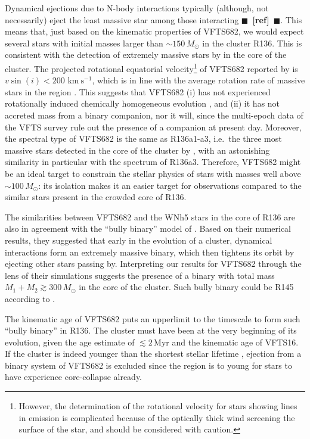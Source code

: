 \documentclass[apjl,twocolumn]{emulateapj}
\newcommand{\todo}[1]{{\large $\blacksquare$~\textbf{\color{red}[#1]}}~$\blacksquare$}
\newcommand{\kms}{{\,\mathrm{km\ s^{-1}}}}
\begin{document}
Dynamical ejections due to N-body interactions typically (although, not necessarily) eject the least
massive star among those interacting \todo{ref}. This means that, just
based on the kinematic properties of VFTS682, we would expect several
stars with initial masses larger than $\sim$$150\,M_\odot$ in the
cluster R136.
This is consistent with the detection
of extremely massive stars by \cite{crowther:10} in the core of the
cluster. The projected rotational equatorial
velocity\footnote{However, the determination of the rotational
  velocity for stars showing lines in emission is complicated because
  of the optically thick wind screening the surface of the star, and should be
  considered with caution.} of VFTS682
reported by \cite{schneider:18} is $v\sin(i)<200\,\kms$, which is in
line with the average rotation rate of massive stars in the region
\citep[][]{ramirez-agudelo:15}. This suggests that VFTS682 (i) has not
experienced rotationally induced chemically homogeneous evolution
\citep[][]{maeder:00,demink:09,marchant:16}, and (ii) it has not
accreted mass from a binary companion, nor it will, since the multi-epoch
data of the VFTS survey rule out the presence of a companion at
present day. Moreover, the spectral type of VFTS682
\citep[WNh5,][]{bestenlehner:11} is the same as R136a1-a3, i.e.~the
three most massive stars detected in the core of the cluster by
\cite{crowther:10}, with an astonishing similarity in particular with
the spectrum of R136a3. Therefore,
VFTS682 might be an ideal target to constrain the stellar physics of
stars with masses well above $\sim$$100\,M_\odot$: its isolation makes
it an easier target for observations compared to the similar stars
present in the crowded core of R136.

The similarities between VFTS682 and the WNh5 stars in the core of
R136 are also in agreement with the ``bully binary'' model of
\cite{fujii:11}. Based on their numerical results, they suggested that
early in the evolution of a cluster, dynamical interactions form an extremely
massive binary, which then tightens its orbit by ejecting other stars passing
by. Interpreting our results for VFTS682 through the lens of their simulations
suggests the presence of a binary with total mass
$M_1+M_2\gtrsim 300\,M_\odot$ in the core of the cluster. Such bully
binary could be R145 according to \cite{fujii:11}.

The kinematic age of VFTS682 puts an
upperlimit to the timescale to form such ``bully binary'' in
R136. The cluster must have been at the very beginning of its
evolution, given the age estimate of $\lesssim 2$\,Myr
\cite{crowther:10,sabbi:12} and the kinematic age of VFTS16. If the
cluster is indeed younger than the shortest stellar lifetime
\citep[$\sim$3\,Myr, e.g.,][]{zapartas:17}, ejection from a binary
system of VFTS682 is excluded since the region is to young for stars
to have experience core-collapse already.
\end{document}
